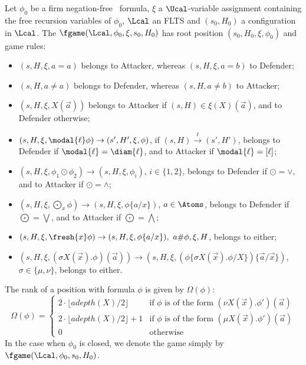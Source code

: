 \begin{definition}\label{def:parityG}
    Let $\phi_0$ be a firm negation-free \fhml\
    formula,
    $\xi$ a $\Ucal$-variable assignment containing the free recursion variables of $\phi_0$, $\Lcal$ an FLTS and $(s_0,H_0)$ a configuration in $\Lcal$.
    The \boldemph{game} $\fgame(\Lcal, \phi_0, \xi, s_0, H_0)$ has root position $(s_0, H_0, \xi, \phi_0)$ and game rules:
    \begin{itemize}
        \item $(s,H,\xi, a = a)$ belongs to Attacker, whereas
 $(s,H,\xi, a = b)$ to Defender;
        \item $(s,H, a \neq a)$ belongs to Defender, whereas 
 $(s,H, a \neq b)$  to Attacker;
        \item $(s,H,\xi, X(\vec a))$ belongs to Attacker if $(s, H)\in \xi(X)(\vec a)$, and to Defender otherwise;
        \item $(s,H,\xi, \modal{\ell}\phi) \rightarrow (s',H',\xi, \phi)$, if $(s, H) \xrightarrow{\ell} (s', H')$, belongs to Defender if $\modal{\ell}=\diam{\ell}$, and to Attacker if $\modal{\ell}=[\ell]$;
        \item $(s,H,\xi, \phi_1 \odot \phi_2) \rightarrow (s,H,\xi,\phi_i)$, $i \in \{1,2\}$, belongs to Defender if $\odot=\lor$, and to Attacker if $\odot=\land$;
                \item $(s,H,\xi, \bigodot\nolimits_x \phi) \rightarrow (s,H,\xi,\phi\{a/x\})$, $a \in \Atoms$, belongs to Defender if $\bigodot=\bigvee$, and to Attacker if $\bigodot=\bigwedge$;
                        \item $(s,H,\xi,\fresh{x}\phi) \rightarrow (s, H, \xi, \phi\{a/x\}),\ a \# \phi,\xi,H$, belongs to either;
        \item $(s,H,\xi, (\sigma X(\vec x).\phi)(\vec a)) \rightarrow (s, H, \xi,(\phi\{\sigma X(\vec x).\phi / X\})\{\vec a / \vec x\})$, $\sigma\in\{\mu,\nu\}$, belongs to either.
            \end{itemize}
              The rank of a position with formula $\phi$ is given by $\Omega(\phi)$:
    \[        \Omega(\phi) =
      \begin{cases} 2 \cdot \lfloor adepth(X)/2 \rfloor & \text{if $\phi$ is of the form }(\nu X(\vec x).\phi')(\vec a)\\
        2 \cdot \lfloor adepth(X)/2 \rfloor + 1 & \text{if $\phi$ is of the form }(\mu X(\vec x).\phi')(\vec a)\\
         0 &\text{otherwise}
      \end{cases}
    \]
In the case when $\phi_0$ is closed, we denote the game simply by $\fgame(\Lcal, \phi_0, s_0, H_0)$.    
\end{definition}

